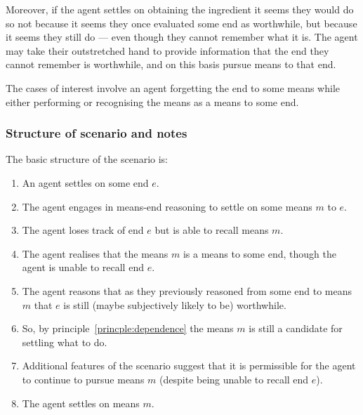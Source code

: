 \documentclass[10pt]{article}
\newcommand{\hozline}[0]{%
  \noindent\hdashrule[0.5ex][c]{\textwidth}{.1pt}{}
}
\begin{document}
Moreover, if the agent settles on obtaining the ingredient it seems they would do so not because it seems they once evaluated some end as worthwhile, but because it seems they still do --- even though they cannot remember what it is.
The agent may take their outstretched hand to provide information that the end they cannot remember is worthwhile, and on this basis pursue means to that end.

The cases of interest involve an agent forgetting the end to some means while either performing or recognising the means as a means to some end.

\hozline

\newpage

\subsubsection*{Structure of scenario and notes}
\label{sec:structure-notes-scenarios}

\hozline

The basic structure of the scenario is:

\begin{enumerate}
\item An agent settles on some end \(e\).
\item The agent engages in means-end reasoning to settle on some means \(m\) to \(e\).
\item The agent loses track of end \(e\) but is able to recall means \(m\).
\item The agent  realises that the means \(m\) is a means to some end, though the agent is unable to recall end \(e\).
\item The agent reasons that as they previously reasoned from some end to means \(m\) that \(e\) is still (maybe subjectively likely to be) worthwhile.
\item So, by principle~\ref{princple:dependence} the means \(m\) is still a candidate for settling what to do.
\item Additional features of the scenario suggest that it is permissible for the agent to continue to pursue means \(m\) (despite being unable to recall end \(e\)).
\item The agent settles on means \(m\).
\end{enumerate}
\end{document}
